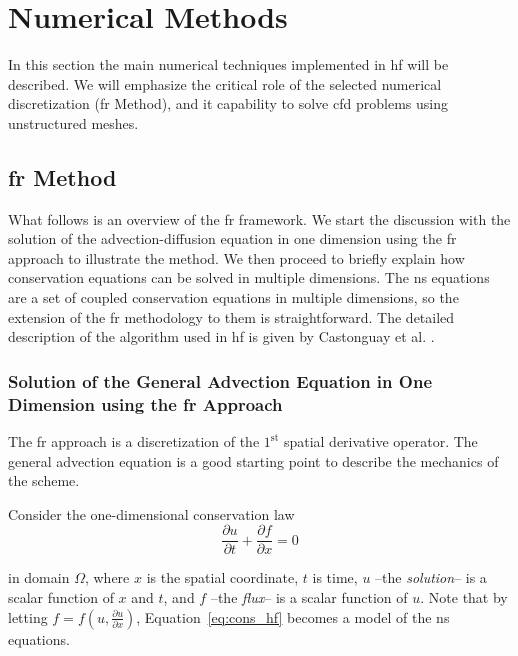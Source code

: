 
\section{Numerical Methods}
\label{sec:numerics}

In this section the main numerical techniques implemented in \gls{hf} will be described. We will emphasize the critical role of the selected numerical discretization (\gls{fr} Method), and it capability to solve \gls{cfd} problems using unstructured meshes. 

\subsection{\gls{fr} Method}
\label{sec:frmethod}

What follows is an overview of the \gls{fr} framework. We start the discussion with the solution of the advection-diffusion equation in one dimension using the \gls{fr} approach to illustrate the method. We then proceed to briefly explain how conservation equations can be solved in multiple dimensions. The \gls{ns} equations are a set of coupled conservation equations in multiple dimensions, so the extension of the \gls{fr} methodology to them is straightforward. The detailed description of the algorithm used in \gls{hf} is given by Castonguay et al. \cite{castonguay2011}.

\subsubsection{Solution of the General Advection Equation in One Dimension using the \gls{fr} Approach}

The \gls{fr} approach is a discretization of the $1^{\mathrm{st}}$ spatial derivative operator. The general advection equation is a good starting point to describe the mechanics of the scheme.

Consider the one-dimensional conservation law
\begin{equation}
\label{eq:cons_hf}
\frac{\partial u}{\partial t} + \frac{\partial f}{\partial x} = 0
\end{equation}

in domain $\Omega$, where $x$ is the spatial coordinate, $t$ is time, $u$ --the \emph{solution}-- is a scalar function of $x$ and $t$, and $f$ --the \emph{flux}-- is a scalar function of $u$. Note that by letting $f = f(u,\frac{\partial u}{\partial x})$, Equation~\ref{eq:cons_hf} becomes a model of the \gls{ns} equations.

